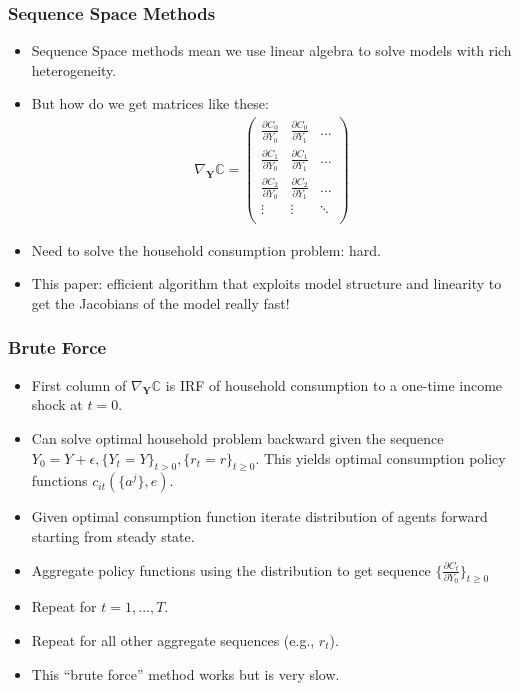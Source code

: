 \documentclass[english,xcolor=svgnames]{beamer}
\begin{document}
\begin{frame}
    \frametitle{Sequence Space Methods}
    \begin{itemize}
    	\item Sequence Space methods mean we use linear algebra to solve models with rich heterogeneity. 
        \item But how do we get matrices like these: 
        \begin{align*}
            \nabla_{\bm{Y}}\pmb{\mathbb{C}} = 
            \begin{pmatrix}
                \frac{\partial C_{0}}{\partial Y_0} & \frac{\partial C_{0}}{\partial Y_1} & \hdots \\
                \frac{\partial C_{1}}{\partial Y_0} & \frac{\partial C_{1}}{\partial Y_1} & \hdots \\
                \frac{\partial C_{2}}{\partial Y_0} & \frac{\partial C_{2}}{\partial Y_1} & \hdots \\
                \vdots & \vdots & \ddots \\
            \end{pmatrix}
        \end{align*}
        \item Need to solve the household consumption problem: hard.
        \item This paper: efficient algorithm that exploits model structure and linearity to get the Jacobians of the model really fast!
    \end{itemize}
\end{frame}

\begin{frame}
    \frametitle{Brute Force}
    \begin{itemize}
    	\item First column of $\nabla_{\bm{Y}}\pmb{\mathbb{C}}$ is IRF of household consumption to a one-time income shock at $t=0$.
        \item Can solve optimal household problem backward given the sequence $Y_0=Y+\epsilon,\{Y_{t}=Y\}_{t>0},\{r_t=r\}_{t\ge 0}$. This yields optimal consumption policy functions $c_{it}(\{a^j\},e)$.
        \item Given optimal consumption function iterate distribution of agents forward starting from steady state.
        \item Aggregate policy functions using the distribution to get sequence $\{\frac{\partial C_{t}}{\partial Y_0}\}_{t\ge 0}$
        \item Repeat for $t=1,...,T$.
        \item Repeat for all other aggregate sequences (e.g., $r_t$).
        \item This ``brute force'' method works but is very slow.
    \end{itemize}
\end{frame}
\end{document}
